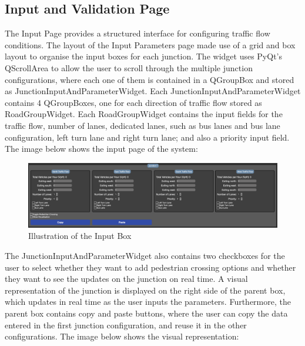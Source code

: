 \documentclass{article}
\begin{document}
    \subsection{Input and Validation Page}

    The Input Page provides a structured interface for configuring traffic flow conditions. The layout of the Input Parameters page made use of a grid and box layout to organise the input boxes for each junction. The widget uses PyQt's QScrollArea to allow the user to scroll through the multiple junction configurations, where each one of them
    is contained in a QGroupBox and stored as JunctionInputAndParameterWidget. Each JunctionInputAndParameterWidget contains 4 QGroupBoxes, one for each direction of traffic flow stored as RoadGroupWidget. Each RoadGroupWidget contains the input fields for the
    traffic flow, number of lanes, dedicated lanes, such as bus lanes and bus lane configuration, left turn lane and right turn lane; and also a priority input field. The image below shows the input page of the system:

    \begin{figure}[h!]
        \centering
        \includegraphics[width=\textwidth]{parameter}
        \caption{Illustration of the Input Box}
        \label{fig:parameter}
    \end{figure}

    The JunctionInputAndParameterWidget also contains two checkboxes for the user to select whether they want to add pedestrian crossing options and whether they want to see the updates on the junction on real time. A visual representation of the
    junction is displayed on the right side of the parent box, which updates in real time as the user inputs the parameters. Furthermore, the parent box contains copy and paste buttons, where the user can copy the data entered
    in the first junction configuration, and reuse it in the other configurations. The image below shows the visual representation:
\end{document}
